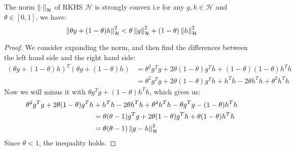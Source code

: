 \begin{lemma}
    The norm $\left\lVert\cdot\right\rVert_\mathcal{H}$ of RKHS $\mathcal{H}$ is strongly convex i.e for any $g, h\in\mathcal{H} $ and $\theta\in[0, 1]$, we have:
    \begin{equation*}
        \left\lVert\theta g + (1-\theta) h\right\rVert_\mathcal{H}^2 < \theta\left\lVert g\right\rVert^2_\mathcal{H} + (1-\theta)\left\lVert h\right\rVert^2_\mathcal{H}
    \end{equation*}
\end{lemma}
\begin{proof}
    We consider expanding the norm, and then find the differences between the left hand side and the right hand side:
    \begin{equation*}
    \begin{aligned}
        (\theta g + (1-\theta)h)^T(\theta g + (1-\theta)h) &= \theta^2 g^Tg + 2\theta(1-\theta)g^Th + (1-\theta)(1-\theta)h^Th \\
        &= \theta^2g^Tg + 2\theta(1-\theta)g^Th + h^Th - 2\theta h^Th + \theta^2 h^Th
    \end{aligned}
    \end{equation*}
    Now we will minus it with $\theta g^Tg + (1-\theta)h^Th$, which gives us:
    \begin{equation*}
    \begin{aligned}
        \theta^2g^Tg + 2\theta(1-\theta)g^Th &+ h^Th - 2\theta h^Th + \theta^2 h^Th - \theta g^Tg - (1-\theta)h^Th \\
        &= \theta(\theta-1)g^Tg + 2\theta(1-\theta)g^Th + \theta(1-\theta)h^Th \\
        &= \theta(\theta - 1)\left\lVert g-h\right\rVert^2_\mathcal{H}
    \end{aligned}
    \end{equation*}
    Since $\theta < 1$, the inequality holds.
\end{proof}

